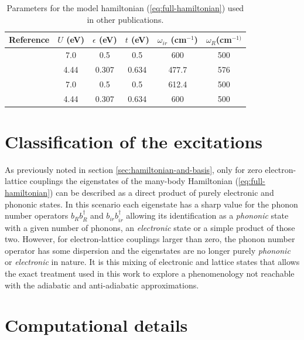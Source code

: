 \begin{table}[h]
  \centering
  \begin{tabular}[h]{| l | c | c | c | c | c |}
    \hline
    Reference & $U$ (eV) & $\epsilon$ (eV) & $t$ (eV) & $\omega_{ir}$ (cm$^{-1}$) & $\omega_R$(cm$^{-1)}$ \\
    \hline
    \cite{MustredeLeon1992} & 7.0 & 0.5 & 0.5 & 600 & 500 \\ 
    \cite{Salkola1994, Salkola1995} & 4.44 & 0.307 & 0.634 & 477.7 & 576  \\
    \cite{DeLeon1999, Leon2008, MirandaMena2007,Mena2006} & 7.0 & 0.5 & 0.5 & 612.4 & 500 \\ 
    \cite{MustredeLeon2000} & 4.44 & 0.307 & 0.634 & 600 & 500 \\
    \hline
  \end{tabular}
  \caption{Parameters for the model hamiltonian (\ref{eq:full-hamiltonian}) used in other publications.}
  \label{tab:parameters}
\end{table}

\section{Classification of the excitations}
\label{sec:classification}

As previously noted in section \ref{sec:hamiltonian-and-basis}, only for zero electron-lattice couplings the eigenstates of the many-body Hamiltonian (\ref{eq:full-hamiltonian}) can be described as a direct product of purely electronic and phononic states. 
In this scenario each eigenstate has a sharp value for the phonon number operators $b_Rb^\dagger_R$ and $b_{ir}b^\dagger_{ir}$ allowing its identification as a \textit{phononic} state with a given number of phonons, an \textit{electronic} state or a simple product of those two.
However, for electron-lattice couplings larger than zero, the phonon number operator has some dispersion and the eigenstates are no longer purely \textit{phononic} or \textit{electronic} in nature.
It is this mixing of electronic and lattice states that allows the exact treatment used in this work to explore a phenomenology not reachable with the adiabatic and anti-adiabatic approximations.



\section{Computational details}
\label{sec:comp_details}

